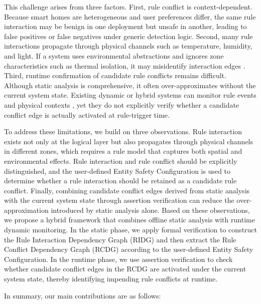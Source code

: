 This challenge arises from three factors. First, rule conflict is context-dependent. Because smart homes are heterogeneous and user preferences differ, the same rule interaction may be benign in one deployment but unsafe in another, leading to false positives or false negatives under generic detection logic. Second, many rule interactions propagate through physical channels such as temperature, humidity, and light. If a system uses environmental abstractions and ignores zone characteristics such as thermal isolation, it may misidentify interaction edges \cite{celik2019iotguard,alhanahnah2022iotcom,chen2019multi,wang2019charting}. Third, runtime confirmation of candidate rule conflicts remains difficult. Although static analysis is comprehensive, it often over-approximates without the current system state. Existing dynamic or hybrid systems can monitor rule events and physical contexts \cite{ding2021iotsafe}, yet they do not explicitly verify whether a candidate conflict edge is actually activated at rule-trigger time.

To address these limitations, we build on three observations. Rule interaction exists not only at the logical layer but also propagates through physical channels in different zones, which requires a rule model that captures both spatial and environmental effects. Rule interaction and rule conflict should be explicitly distinguished, and the user-defined Entity Safety Configuration is used to determine whether a rule interaction should be retained as a candidate rule conflict. Finally, combining candidate conflict edges derived from static analysis with the current system state through assertion verification can reduce the over-approximation introduced by static analysis alone. Based on these observations, we propose a hybrid framework that combines offline static analysis with runtime dynamic monitoring. In the static phase, we apply formal verification to construct the Rule Interaction Dependency Graph (RIDG) and then extract the Rule Conflict Dependency Graph (RCDG) according to the user-defined Entity Safety Configuration. In the runtime phase, we use assertion verification to check whether candidate conflict edges in the RCDG are activated under the current system state, thereby identifying impending rule conflicts at runtime.

In summary, our main contributions are as follows:

